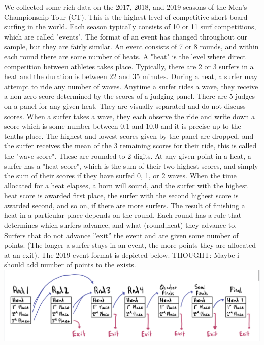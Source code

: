 \documentclass{article}
\theoremstyle{definition}
\begin{document}
We collected some rich data on the 2017, 2018, and 2019 seasons of the Men's Championship Tour (CT). This is the highest level of competitive short board surfing in the world. Each season typically consists of 10 or 11 surf competitions, which are called "events". The format of an event has changed throughout our sample, but they are fairly similar. An event consists of 7 or 8 rounds, and within each round there are some number of heats. A "heat" is the level where direct competition between athletes takes place. Typically, there are 2 or 3 surfers in a heat and the duration is between 22 and 35 minutes. During a heat, a surfer may attempt to ride any number of waves. Anytime a surfer rides a wave, they receive a non-zero score determined by the scores of a judging panel. There are 5 judges on a panel for any given heat. They are visually separated and do not discuss scores. When a surfer takes a wave, they each observe the ride and write down a score which is some number between 0.1 and 10.0 and it is precise up to the tenths place. The highest and lowest scores given by the panel are dropped, and the surfer receives the mean of the 3 remaining scores for their ride, this is called the "wave score". These are rounded to 2 digits. At any given point in a heat, a surfer has a "heat score", which is the sum of their two highest scores, and simply the sum of their scores if they have surfed 0, 1, or 2 waves. When the time allocated for a heat elapses, a horn will sound, and the surfer with the highest heat score is awarded first place, the surfer with the second highest score is awarded second, and so on, if there are more surfers. The result of finishing a heat in a particular place depends on the round.  Each round has a rule that determines which surfers advance, and what (round,heat) they advance to.  Surfers that do not advance ”exit” the event and are given some number of points. (The longer a surfer stays in an event, the more points they are allocated at an exit). The 2019 event format is depicted below.
THOUGHT: Maybe i should add number of points to the exists.
\includegraphics[width=\textwidth]{./src/visuals/2019EvtFormat.jpeg}
\end{document}
